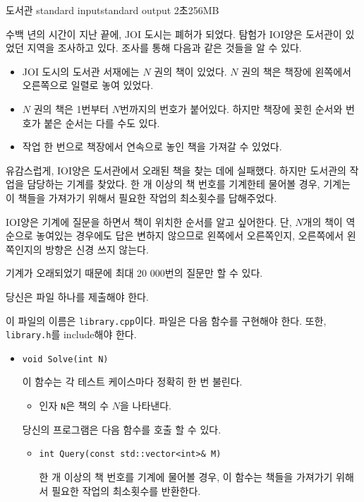 \begin{problem}{도서관}
	{standard input}{standard output}
	{2초}{256MB}{}
	
	수백 년의 시간이 지난 끝에, JOI 도시는 폐허가 되었다. 탐험가 IOI양은 도서관이 있었던 지역을 조사하고 있다. 조사를 통해 다음과 같은 것들을 알 수 있다.
	
	\begin{itemize}
		\item JOI 도시의 도서관 서재에는 $N$ 권의 책이 있었다. $N$ 권의 책은 책장에 왼쪽에서 오른쪽으로 일렬로 놓여 있었다.
		\item $N$ 권의 책은 1번부터 $N$번까지의 번호가 붙어있다. 하지만 책장에 꽂힌 순서와 번호가 붙은 순서는 다를 수도 있다.
		\item 작업 한 번으로 책장에서 연속으로 놓인 책을 가져갈 수 있었다.
	\end{itemize}

	유감스럽게, IOI양은 도서관에서 오래된 책을 찾는 데에 실패했다. 하지만 도서관의 작업을 담당하는 기계를 찾았다. 한 개 이상의 책 번호를 기계한테 물어볼 경우, 기계는 이 책들을 가져가기 위해서 필요한 작업의 최소횟수를 답해주었다.
	
	IOI양은 기계에 질문을 하면서 책이 위치한 순서를 알고 싶어한다. 단, $N$개의 책이 역순으로 놓여있는 경우에도 답은 변하지 않으므로 왼쪽에서 오른쪽인지, 오른쪽에서 왼쪽인지의 방향은 신경 쓰지 않는다.
	
	기계가 오래되었기 때문에 최대 20 000번의 질문만 할 수 있다.
	
	\Specification
	
	당신은 파일 하나를 제출해야 한다.
	
	이 파일의 이름은 \texttt{library.cpp}이다. 파일은 다음 함수를 구현해야 한다. 또한, \texttt{library.h}를 include해야 한다.
	
	\begin{itemize}
		\item \texttt{void Solve(int N)}
		
		이 함수는 각 테스트 케이스마다 정확히 한 번 불린다.
		\begin{itemize}
			\item 인자 \texttt{N}은 책의 수 $N$을 나타낸다.
		\end{itemize}
		
		당신의 프로그램은 다음 함수를 호출 할 수 있다.
		\begin{itemize}
			\item \texttt{int Query(const std::vector<int>\& M)}
			
			한 개 이상의 책 번호를 기계에 물어볼 경우, 이 함수는 책들을 가져가기 위해서 필요한 작업의 최소횟수를 반환한다.
			

\end{itemize}
\end{itemize}
\end{problem}
